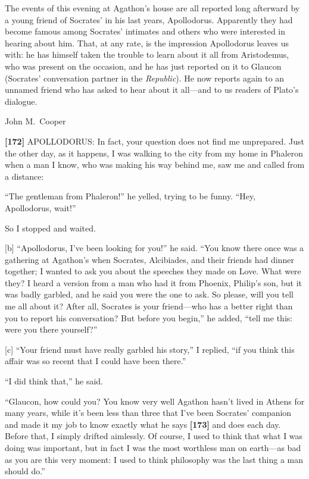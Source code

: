 The events of this evening at Agathon's house are all reported long
afterward by a young friend of Socrates' in his last years,
Apollodorus. Apparently they had become famous among Socrates'
intimates and others who were interested in hearing about him.
That, at any rate, is the impression Apollodorus leaves us with:
he has himself taken the trouble to learn about it all from
Aristodemus, who was present on the occasion, and he has just
reported on it to Glaucon (Socrates' conversation partner in the
{\em Republic}). He now reports again to an unnamed friend who has
asked to hear about it all---and to us readers of Plato's
dialogue.

\hfill John M.~Cooper\par
\stopchapter

{\bf {[}172{]}} APOLLODORUS: In fact, your question does not find me
unprepared. Just the other day, as it happens, I was walking to the city
from my home in Phaleron when a man I know, who was making his way
behind me, saw me and called from a distance:

“The gentleman from Phaleron!” he yelled, trying to be funny. “Hey,
Apollodorus, wait!”

So I stopped and waited.

{[}b{]} “Apollodorus, I've been looking for you!” he said. “You know
there once was a gathering at Agathon's when Socrates, Alcibiades, and
their friends had dinner together; I wanted to ask you about the
speeches they made on Love. What were they? I heard a version from a man
who had it from Phoenix, Philip's son, but it was badly garbled, and he
said you were the one to ask. So please, will you tell me all about it?
After all, Socrates is your friend---who has a better right than you to
report his conversation? But before you begin,” he added, “tell me this:
were you there yourself?”

{[}c{]} “Your friend must have really garbled his story,” I replied, “if
you think this affair was so recent that I could have been there.”

“I did think that,” he said.

“Glaucon, how could you? You know very well Agathon hasn't lived in
Athens for many years, while it's been less than three that I've been
Socrates' companion and made it my job to know exactly what he says
{\bf {[}173{]}} and does each day. Before that, I simply drifted
aimlessly. Of course, I used to think that what I was doing was
important, but in fact I was the most worthless man on earth---as bad as
you are this very moment: I used to think philosophy was the last thing
a man should do.”

